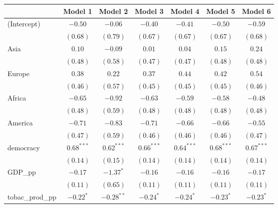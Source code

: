 
\begin{table}[!h]
\begin{center}
\begin{tabular}{l c c c c c c }
\toprule
 & Model 1 & Model 2 & Model 3 & Model 4 & Model 5 & Model 6 \\
\midrule
(Intercept)             & $-0.50$      & $-0.06$      & $-0.40$      & $-0.41$      & $-0.50$      & $-0.59$      \\
                        & $(0.68)$     & $(0.79)$     & $(0.67)$     & $(0.67)$     & $(0.67)$     & $(0.68)$     \\
Asia                    & $0.10$       & $-0.09$      & $0.01$       & $0.04$       & $0.15$       & $0.24$       \\
                        & $(0.48)$     & $(0.58)$     & $(0.47)$     & $(0.47)$     & $(0.48)$     & $(0.48)$     \\
Europe                  & $0.38$       & $0.22$       & $0.37$       & $0.44$       & $0.42$       & $0.54$       \\
                        & $(0.46)$     & $(0.57)$     & $(0.45)$     & $(0.45)$     & $(0.45)$     & $(0.46)$     \\
Africa                  & $-0.65$      & $-0.92$      & $-0.63$      & $-0.59$      & $-0.58$      & $-0.48$      \\
                        & $(0.48)$     & $(0.59)$     & $(0.48)$     & $(0.48)$     & $(0.48)$     & $(0.48)$     \\
America                 & $-0.71$      & $-0.83$      & $-0.71$      & $-0.66$      & $-0.66$      & $-0.55$      \\
                        & $(0.47)$     & $(0.59)$     & $(0.46)$     & $(0.46)$     & $(0.46)$     & $(0.47)$     \\
democracy               & $0.68^{***}$ & $0.62^{***}$ & $0.66^{***}$ & $0.64^{***}$ & $0.68^{***}$ & $0.67^{***}$ \\
                        & $(0.14)$     & $(0.15)$     & $(0.14)$     & $(0.14)$     & $(0.14)$     & $(0.14)$     \\
GDP\_pp                 & $-0.17$      & $-1.37^{*}$  & $-0.16$      & $-0.16$      & $-0.16$      & $-0.17$      \\
                        & $(0.11)$     & $(0.65)$     & $(0.11)$     & $(0.11)$     & $(0.11)$     & $(0.11)$     \\
tobac\_prod\_pp         & $-0.22^{*}$  & $-0.28^{**}$ & $-0.24^{*}$  & $-0.24^{*}$  & $-0.23^{*}$  & $-0.23^{*}$  \\

\end{tabular}
\end{center}
\end{table}
